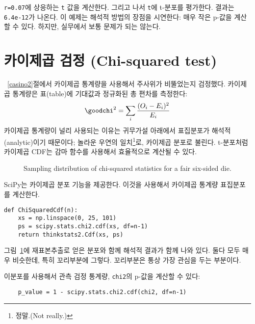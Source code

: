 {\tt r=0.07}에 상응하는 {\tt t} 값을 계산한다. 그리고 나서 {\tt t}에 t-분포를 평가한다. 결과는 {\tt 6.4e-12}가 나온다.
이 예제는 해석적 방법의 장점을 시연한다: 매우 작은 p-값을 계산할 수 있다. 하지만, 실무에서 보통 문제가 되는 않는다.


\section{카이제곱 검정 (Chi-squared test)}

~\ref{casino2}절에서 카이제곱 통계량을 사용해서 주사위가 비뚤었는지 검정했다. 카이제곱 통계량은 표(table)에 기대값과 정규화된 총 편차를 측정한다:
%
\[ \goodchi^2 = \sum_i \frac{(O_i - E_i)^2}{E_i} \]
%
카이제곱 통계량이 널리 사용되는 이유는 귀무가설 아래에서 표집분포가 해석적(analytic)이기 때문이다; 놀라운 우연의 일치\footnote{정말.(Not really.)}로, 카이제곱 분포로 불린다.
t-분포처럼 카이제곱 CDF는 감마 함수를 사용해서 효율적으로 계산될 수 있다.

\begin{figure}
\caption{Sampling distribution of chi-squared statistics for
a fair six-sided die.}
\label{normal5}
\end{figure}

SciPy는 카이제곱 분포 기능을 제공한다. 이것을 사용해서 카이제곱 통계량 표집분포를 계산한다.

\begin{verbatim}
def ChiSquaredCdf(n):
    xs = np.linspace(0, 25, 101)
    ps = scipy.stats.chi2.cdf(xs, df=n-1)
    return thinkstats2.Cdf(xs, ps)
\end{verbatim}

그림~\ref{normal5}에 재표본추출로 얻은 분포와 함께 해석적 결과가 함께 나와 있다. 둘다 모두 매우 비슷한데, 특히 꼬리부분에 그렇다. 꼬리부분은 통상 가장 관심을 두는 부분이다.

이분포를 사용해서 관측 검정 통계량, {\tt chi2}의 p-값을 계산할 수 있다:

\begin{verbatim}
    p_value = 1 - scipy.stats.chi2.cdf(chi2, df=n-1)
\end{verbatim}


